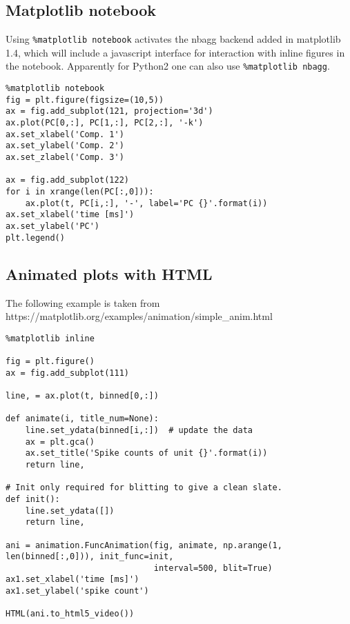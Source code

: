     \subsection{Matplotlib notebook}\label{matplotlib-notebook}

Using \texttt{\%matplotlib\ notebook} activates the nbagg backend added
in matplotlib 1.4, which will include a javascript interface for
interaction with inline figures in the notebook. Apparently for Python2
one can also use \texttt{\%matplotlib\ nbagg}.
%
\begin{lstlisting}
%matplotlib notebook
fig = plt.figure(figsize=(10,5))
ax = fig.add_subplot(121, projection='3d')
ax.plot(PC[0,:], PC[1,:], PC[2,:], '-k')
ax.set_xlabel('Comp. 1')
ax.set_ylabel('Comp. 2')
ax.set_zlabel('Comp. 3')

ax = fig.add_subplot(122)
for i in xrange(len(PC[:,0])):
    ax.plot(t, PC[i,:], '-', label='PC {}'.format(i))
ax.set_xlabel('time [ms]')
ax.set_ylabel('PC')
plt.legend()
\end{lstlisting}%
    
    

    
    
    

    
    
    
    

    

    \subsection{Animated plots with HTML}\label{animated-plots-with-html}

    The following example is taken from
https://matplotlib.org/examples/animation/simple\_anim.html
%
\begin{lstlisting}
%matplotlib inline

fig = plt.figure()
ax = fig.add_subplot(111)

line, = ax.plot(t, binned[0,:])

def animate(i, title_num=None):
    line.set_ydata(binned[i,:])  # update the data
    ax = plt.gca()
    ax.set_title('Spike counts of unit {}'.format(i))
    return line,

# Init only required for blitting to give a clean slate.
def init():
    line.set_ydata([])
    return line,

ani = animation.FuncAnimation(fig, animate, np.arange(1, len(binned[:,0])), init_func=init,
                              interval=500, blit=True)
ax1.set_xlabel('time [ms]')
ax1.set_ylabel('spike count')

HTML(ani.to_html5_video())
\end{lstlisting}
